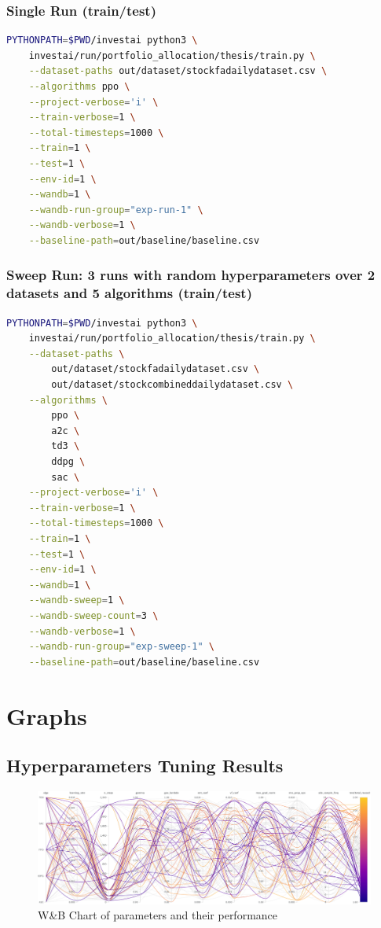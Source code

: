 \documentclass[../xlapes02]{subfiles}
\begin{document}
    \subsection{Single Run (train/test)}\label{subsec:single-run-(train/test)}
    \begin{lstlisting}[language=bash,label={lst:run-train}]
PYTHONPATH=$PWD/investai python3 \
    investai/run/portfolio_allocation/thesis/train.py \
    --dataset-paths out/dataset/stockfadailydataset.csv \
    --algorithms ppo \
    --project-verbose='i' \
    --train-verbose=1 \
    --total-timesteps=1000 \
    --train=1 \
    --test=1 \
    --env-id=1 \
    --wandb=1 \
    --wandb-run-group="exp-run-1" \
    --wandb-verbose=1 \
    --baseline-path=out/baseline/baseline.csv
    \end{lstlisting}

    \subsection{Sweep Run: 3 runs with random hyperparameters over 2 datasets and 5 algorithms (train/test)}\label{subsec:sweep-run:-3-runs-with-random-hyperparameters-over-2-datasets-and-5-algorithms-(train/test)}
    \begin{lstlisting}[language=bash,label={lst:sweep-train}]
PYTHONPATH=$PWD/investai python3 \
    investai/run/portfolio_allocation/thesis/train.py \
    --dataset-paths \
        out/dataset/stockfadailydataset.csv \
        out/dataset/stockcombineddailydataset.csv \
    --algorithms \
        ppo \
        a2c \
        td3 \
        ddpg \
        sac \
    --project-verbose='i' \
    --train-verbose=1 \
    --total-timesteps=1000 \
    --train=1 \
    --test=1 \
    --env-id=1 \
    --wandb=1 \
    --wandb-sweep=1 \
    --wandb-sweep-count=3 \
    --wandb-verbose=1 \
    --wandb-run-group="exp-sweep-1" \
    --baseline-path=out/baseline/baseline.csv
    \end{lstlisting}


    \chapter{Graphs}\label{ch:graphs}
    \section{Hyperparameters Tuning Results}\label{sec:hyperparameters-tuning-results}
    \begin{figure}[H]
        \centering
        \includegraphics[width=\linewidth]{image/wandb/wb1}
        \caption{W\&B Chart of parameters and their performance}
        \label{fig:wb-chart1}
    \end{figure}
\end{document}
